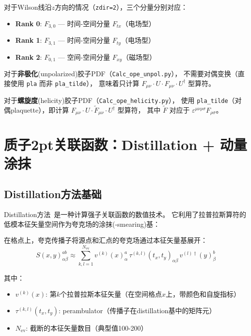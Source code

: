 \documentclass[12pt,a4paper]{ctexart}
\begin{document}
\begin{physbox}[三个Lorentz分量的物理意义]

对于Wilson线沿$z$方向的情况（\texttt{zdir=2}），三个分量分别对应：

\begin{itemize}
    \item \textbf{Rank 0}: $F_{3,0}$ — 时间-空间分量 $F_{tx}$（电场型）
    \item \textbf{Rank 1}: $F_{3,1}$ — 时间-空间分量 $F_{ty}$（电场型）
    \item \textbf{Rank 2}: $F_{0,1}$ — 空间-空间分量 $F_{xy}$（磁场型）
\end{itemize}

对于\textbf{非极化}(unpolarized)胶子PDF（\texttt{Calc\_ope\_unpol.py}），
不需要对偶变换（直接使用 \texttt{pla} 而非 \texttt{pla\_tilde}），
意味着只计算 $F_{\mu\nu}\cdot U \cdot F_{\mu\nu}\cdot U^\dagger$ 型算符。

对于\textbf{螺旋度}(helicity)胶子PDF（\texttt{Calc\_ope\_helicity.py}），
使用 \texttt{pla\_tilde}（对偶plaquette），即计算
$F_{\mu\nu}\cdot U \cdot \tilde{F}_{\mu\nu}\cdot U^\dagger$ 型算符，
其中 $\tilde{F}$ 对应于 $\varepsilon^{\mu\nu\rho\sigma}F_{\rho\sigma}$。
\end{physbox}

\section{质子2pt关联函数：Distillation + 动量涂抹}

\subsection{Distillation方法基础}

Distillation方法~\cite{Distillation_High_Momentum,Peardon_2009}是一种计算强子关联函数的数值技术。
它利用了拉普拉斯算符的低模本征矢量空间作为夸克场的涂抹(-smearing)基：

\begin{physbox}[Distillation的夸克场展开]
在格点上，夸克传播子将源点和汇点的夸克场通过本征矢量基展开：
\begin{equation}
    S(x, y)_{\alpha\beta}^{ab} \approx
    \sum_{k,l=1}^{N_{\text{ev}}} v^{(k)}(x)_\alpha^a \,
    \tau^{(k,l)}(t_x, t_y)_{\alpha\beta} \,
    v^{(l)\dagger}(y)_\beta^b
    \label{eq:distillation}
\end{equation}

其中：
\begin{itemize}
    \item $v^{(k)}(x)$: 第$k$个拉普拉斯本征矢量（在空间格点$x$上，带颜色和自旋指标）
    \item $\tau^{(k,l)}(t_x, t_y)$: perambulator（传播子在distillation基中的矩阵元）
    \item $N_{\text{ev}}$: 截断的本征矢量数目（典型值100-200）
\end{itemize}
\end{physbox}
\end{document}

